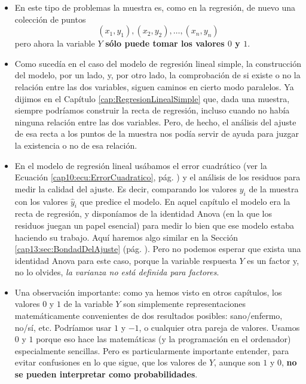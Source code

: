\begin{itemize}

  \item En este tipo de problemas la muestra es, como en la regresión, de nuevo una colección de puntos
  \[(x_1, y_1), (x_2, y_2), \ldots, (x_n, y_n)\]
  pero ahora la variable $Y$ {\bf sólo puede tomar los valores $0$ y $1$}.

  \item Como sucedía en el caso del modelo de regresión lineal simple, la construcción del modelo, por un lado, y, por otro lado, la comprobación de si existe o no la relación entre las dos variables, siguen caminos en cierto modo paralelos. Ya dijimos en el Capítulo \ref{cap:RegresionLinealSimple} que, dada una muestra, siempre podríamos construir la recta de regresión, incluso cuando no había ninguna relación entre las dos variables. Pero, de hecho, el análisis del ajuste de esa recta a los puntos de la muestra nos podía servir de ayuda para juzgar la existencia o no de esa relación.

  \item En el modelo de regresión lineal usábamos el error cuadrático (ver la Ecuación \ref{cap10:ecu:ErrorCuadratico}, pág. \pageref{cap10:ecu:ErrorCuadratico}) y el análisis de los residuos para medir la calidad del ajuste. Es decir, comparando los valores $y_i$ de la muestra con los valores $\hat y_i$ que predice el modelo. En aquel capítulo el modelo era la recta de regresión, y disponíamos de la identidad Anova (en la que los residuos juegan un papel esencial) para medir lo bien que ese modelo estaba haciendo su trabajo. Aquí haremos algo similar en la Sección \ref{cap13:sec:BondadDelAjuste} (pág. \pageref{cap13:sec:BondadDelAjuste}). Pero no podemos esperar que exista una identidad Anova para este caso, porque la variable respuesta $Y$  es un factor y, no lo olvides, {\em la varianza no está definida para factores}.

  \item Una observación importante: como ya hemos visto en otros capítulos, los valores $0$ y $1$ de la variable $Y$ son simplemente representaciones matemáticamente convenientes de dos resultados posibles: sano/enfermo, no/sí, etc. Podríamos usar $1$ y $-1$, o cualquier otra pareja de valores. Usamos $0$ y $1$ porque eso hace las matemáticas (y la programación en el ordenador) especialmente sencillas. Pero es particularmente importante entender, para evitar confusiones  en lo que sigue, que los valores de $Y$, aunque son $1$ y $0$, {\bf no se pueden interpretar  como probabilidades}.

\end{itemize}

